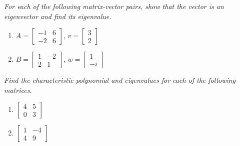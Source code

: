 \documentclass[10pt]{article}
\begin{document}
\noindent
\textit{For each of the following matrix-vector pairs, show that the vector is an eigenvector and find its eigenvalue.} %
\begin{multicols}{2}
\begin{enumerate}
\setcounter{enumi}{\theenumCount}
\item $A = \begin{bmatrix} -1 & 6 \\ -2 & 6 \end{bmatrix}$, $v = \begin{bmatrix} 3 \\ 2 \end{bmatrix}$

\item $B = \begin{bmatrix} 1 & -2 \\ 2 & 1 \end{bmatrix}$, $w = \begin{bmatrix} 1 \\ -i \end{bmatrix}$ 
\setcounter{enumCount}{\theenumi}
\end{enumerate} 
\end{multicols}
\vfill



\newpage
\noindent
\textit{Find the characteristic polynomial and eigenvalues for each of the following matrices.}

\begin{multicols}{2}
\begin{enumerate}
\setcounter{enumi}{\theenumCount}
\item $\begin{bmatrix} 4 & 5 \\ 0 & 3 \end{bmatrix}$


\item $\begin{bmatrix} 1 & -4 \\ 4 & 9 \end{bmatrix}$

\setcounter{enumCount}{\theenumi}
\end{enumerate} 
\end{multicols}
\vfill
\end{document}
